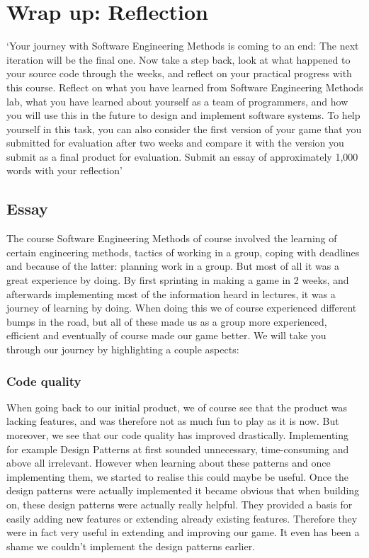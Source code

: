 \chapter{Wrap up: Reflection}

`Your journey with Software Engineering Methods is coming to an end: The next iteration will be the final
one. Now take a step back, look at what happened to your source code through the weeks, and reflect on
your practical progress with this course.
Reflect on what you have learned from Software Engineering Methods lab, what you have learned about
yourself as a team of programmers, and how you will use this in the future to design and implement
software systems. To help yourself in this task, you can also consider the first version of your game that
you submitted for evaluation after two weeks and compare it with the version you submit as a final product
for evaluation. Submit an essay of approximately 1,000 words with your reflection'

\section{Essay}
The course Software Engineering Methods of course involved the learning of certain engineering methods, tactics of working in a group, coping with deadlines and because of the latter: planning work in a group. But most of all it was a great experience by doing. By first sprinting in making a game in 2 weeks, and afterwards implementing most of the information heard in lectures, it was a journey of learning by doing. When doing this we of course experienced different bumps in the road, but all of these made us as a group more experienced, efficient and eventually of course made our game better. We will take you through our journey by highlighting a couple aspects:

\subsection{Code quality}
When going back to our initial product, we of course see that the product was lacking features, and was therefore not as much fun to play as it is now. But moreover, we see that our code quality has improved drastically. Implementing for example Design Patterns at first sounded unnecessary, time-consuming and above all irrelevant. However when learning about these patterns and once implementing them, we started to realise this could maybe be useful. Once the design patterns were actually implemented it became obvious that when building on, these design patterns were actually really helpful. They provided a basis for easily adding new features or extending already existing features. Therefore they were in fact very useful in extending and improving our game. It even has been a shame we couldn't implement the design patterns earlier. 

